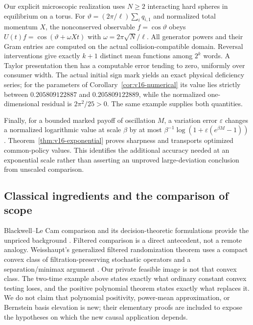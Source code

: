 Our explicit microscopic realization uses $N\ge2$ interacting hard
spheres in equilibrium on a torus. For
$\vartheta=(2\pi/\ell)\sum_iq_{i,1}$ and normalized total momentum $X$,
the nonconserved observable $f=\cos\vartheta$ obeys
$U(t)f=\cos(\vartheta+\omega Xt)$ with $\omega=2\pi\sqrt N/\ell$.
All generator powers and their Gram entries are computed on the
actual collision-compatible domain. Reversal interventions give exactly
$k+1$ distinct mean functions among $2^k$ words. A Taylor presentation
then has a computable error tending to zero, uniformly over consumer
width. The actual initial sign mark yields an exact physical deficiency
series; for the parameters of Corollary~\ref{cor:v16-numerical} its
value lies strictly between $0.205809122887$ and $0.205809122889$, while
the normalized one-dimensional residual is $2\pi^2/25>0$.
The same example supplies both quantities.

Finally, for a bounded marked payoff of oscillation $M$, a variation
error $\varepsilon$ changes a normalized logarithmic value at scale
$\beta$ by at most
$\beta^{-1}\log(1+\varepsilon(e^{\beta M}-1))$.
Theorem~\ref{thm:v16-exponential} proves sharpness and transports
optimized common-policy values. This identifies the additional
accuracy needed at an exponential scale rather than asserting an
unproved large-deviation conclusion from unscaled comparison.

\subsection{Classical ingredients and the comparison of scope}
Blackwell--Le Cam comparison and its decision-theoretic formulations
provide the unpriced background \cite{Blackwell1953,LeCam1964,Torgersen1991}.
Filtered comparison is a direct antecedent, not a remote analogy.
Weisshaupt's generalized filtered randomization theorem uses a compact
convex class of filtration-preserving stochastic operators and a
separation/minimax argument \cite{Weisshaupt2002}. Our private feasible
image is not that convex class. The two-time example above states
exactly what ordinary constant convex testing loses, and the positive
polynomial theorem states exactly what replaces it. We do not claim
that polynomial positivity, power-mean approximation, or Bernstein
basis elevation is new; their elementary proofs are included to expose
the hypotheses on which the new causal application depends.

